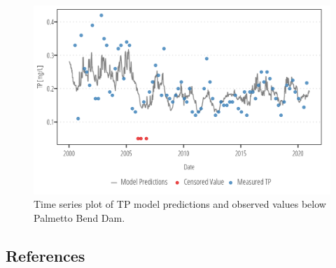\documentclass[
]{article}
\begin{document}
\begin{figure}[h]

{\centering \includegraphics{model_assessment_files/figure-pdf/unnamed-chunk-73-1.png}

}

\caption{Time series plot of TP model predictions and observed values
below Palmetto Bend Dam.}

\end{figure}

\clearpage

\hypertarget{references}{%
\subsection*{References}\label{references}}
\end{document}
